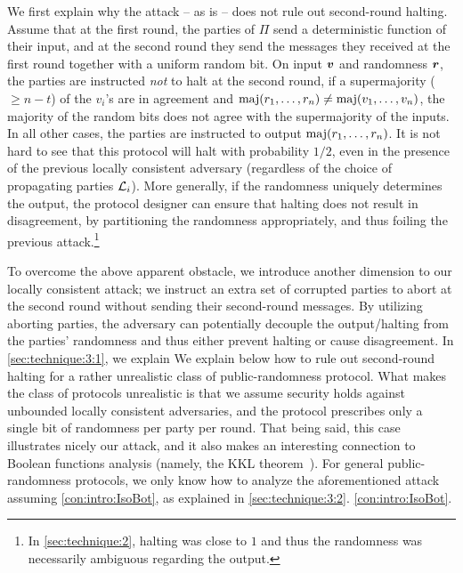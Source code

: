 We first explain why the attack -- as is -- does not rule out second-round halting. Assume that at the first round, the parties of $\Pi$ send a deterministic function of their input, and at the second round  they send the messages they received at the first round together with a uniform random bit. On input ${ \boldsymbol{v}}$ and randomness ${ \boldsymbol{r}}$, the parties are instructed \emph{not} to halt at the second round, if a supermajority ($\ge n-t$) of the $v_i$'s are in agreement and $\operatorname*{maj}(r_1,\ldots, r_n)\neq \operatorname*{maj}(v_1,\ldots, v_n)$,  \ie the majority of the random bits does not agree with the supermajority of the inputs. In all other cases, the parties are instructed to output $\operatorname*{maj}(r_1,\ldots, r_n)$. It is not hard to see that this protocol will halt with probability $1/2$, even in the presence of the previous locally consistent adversary (regardless of the choice of propagating parties ${\cal{L}}_i$). More generally, if the randomness uniquely determines the output, the protocol designer can ensure that halting does not result in disagreement, by partitioning the randomness appropriately, and thus foiling the previous attack.\footnote{In \cref{sec:technique:2}, halting was close to $1$ and thus the randomness was necessarily ambiguous regarding the output.}


To overcome the above apparent obstacle, we introduce another dimension to our locally consistent attack; we instruct an extra set of corrupted parties to abort at the second round without sending their second-round messages. By utilizing aborting parties, the adversary can potentially decouple the output/halting from the parties' randomness and thus either prevent halting or cause disagreement.
\ifdefined\IsFullVersion
In \cref{sec:technique:3:1}, we explain
\else
We explain below
\fi
how to rule out second-round halting for a rather unrealistic class of public-randomness protocol. What makes the class of protocols unrealistic is that we assume security holds  against unbounded locally consistent adversaries, and the protocol prescribes only a single bit of randomness per party per round. That being said, this case illustrates nicely our attack, and it also makes an interesting connection to Boolean functions analysis (namely, the  KKL theorem~\cite{KKL88}).  For  general public-randomness protocols, we only  know how to analyze the aforementioned attack assuming
\ifdefined\IsFullVersion
\cref{con:intro:IsoBot}, as explained in   \cref{sec:technique:3:2}.
\else
\cref{con:intro:IsoBot}.
\fi



\ifdefined\IsFullVersion\else
\vspace{-.1cm}
\fi
\ifdefined\IsFullVersion

